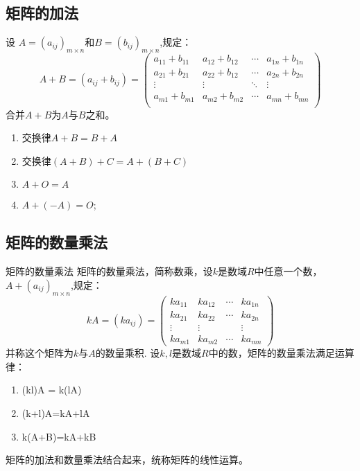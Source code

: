 \documentclass[lang=cn,10pt]{elegantbook}
\begin{document}
\subsection{矩阵的加法}
\begin{definition}[矩阵加法] \label{def:jzjf} 
设 $A=(a_{ij})_{m\times n}$和$B=(b_{ij})_{m\times n}$,规定：
\begin{equation}
    A+B=(a_{ij}+b_{ij})=\begin{pmatrix}
        a_{11}+b_{11}&a_{12}+b_{12}&\cdots&a_{1n}+b_{1n}\\
        a_{21}+b_{21}&a_{22}+b_{12}&\cdots&a_{2n}+b_{2n}\\
        \vdots &\vdots &\ddots &\vdots\\
        a_{m1}+b_{m1}&a_{m2}+b_{m2}&\cdots&a_{mn}+b_{mn}\\ 
    \end{pmatrix}
\end{equation}
合并$A+B$为$A$与$B$之和。
\end{definition}

\begin{property}
    \begin{enumerate}
        \item 交换律$A+B=B+A$
        \item 交换律$(A+B)+C=A+(B+C)$
        \item $A+O=A$
        \item $A+(-A)=O$;
    \end{enumerate}
\end{property}

\subsection{矩阵的数量乘法}
\begin{definition}{矩阵的数量乘法}
    矩阵的数量乘法，简称数乘，设$k$是数域$R$中任意一个数，$A+(a_{ij})_{m \times n}$,规定：\begin{equation}
        kA=(ka_{ij})=\begin{pmatrix}
       ka_{11}&ka_{12}& \cdots & ka_{1n}\\
       ka_{21}&ka_{22}& \cdots & ka_{2n}\\
       \vdots&\vdots&         &\vdots\\
       ka_{m1}&ka_{m2}& \cdots & ka_{mn}
        \end{pmatrix}
    \end{equation}
    并称这个矩阵为$k$与$A$的数量乘积.
    设$k,l$是数域$R$中的数，矩阵的数量乘法满足运算律：
    \begin{enumerate}
        \item (kl)A = k(lA)
        \item (k+l)A=kA+lA
        \item k(A+B)=kA+kB
    \end{enumerate}
    矩阵的加法和数量乘法结合起来，统称矩阵的线性运算。
\end{definition}
\end{document}
